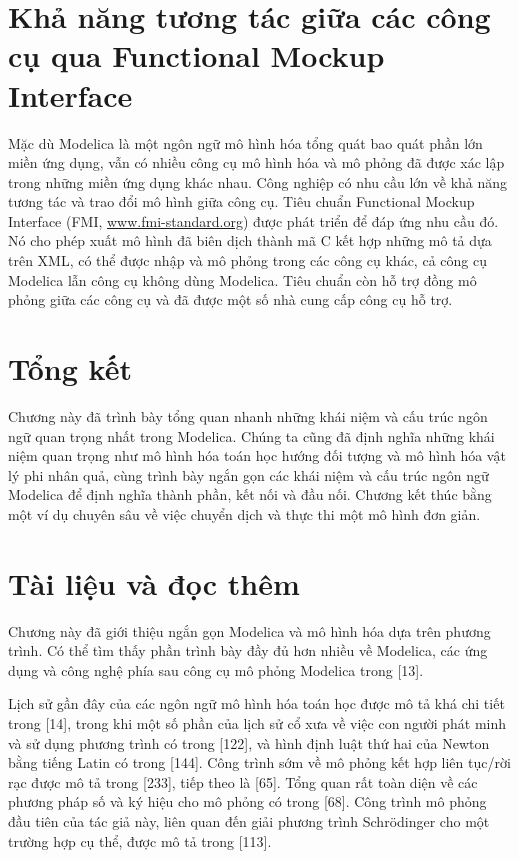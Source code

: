 \section{Khả năng tương tác giữa các công cụ qua Functional Mockup Interface}
Mặc dù Modelica là một ngôn ngữ mô hình hóa tổng quát bao quát phần lớn miền ứng dụng, vẫn có nhiều công cụ mô hình hóa và mô phỏng đã được xác lập trong những miền ứng dụng khác nhau. Công nghiệp có nhu cầu lớn về khả năng tương tác và trao đổi mô hình giữa công cụ. Tiêu chuẩn Functional Mockup Interface (FMI, \url{www.fmi-standard.org}) được phát triển để đáp ứng nhu cầu đó. Nó cho phép xuất mô hình đã biên dịch thành mã C kết hợp những mô tả dựa trên XML, có thể được nhập và mô phỏng trong các công cụ khác, cả công cụ Modelica lẫn công cụ không dùng Modelica. Tiêu chuẩn còn hỗ trợ đồng mô phỏng giữa các công cụ và đã được một số nhà cung cấp công cụ hỗ trợ.

\section{Tổng kết}
Chương này đã trình bày tổng quan nhanh những khái niệm và cấu trúc ngôn ngữ quan trọng nhất trong Modelica. Chúng ta cũng đã định nghĩa những khái niệm quan trọng như mô hình hóa toán học hướng đối tượng và mô hình hóa vật lý phi nhân quả, cùng trình bày ngắn gọn các khái niệm và cấu trúc ngôn ngữ Modelica để định nghĩa thành phần, kết nối và đầu nối. Chương kết thúc bằng một ví dụ chuyên sâu về việc chuyển dịch và thực thi một mô hình đơn giản.

\section{Tài liệu và đọc thêm}
Chương này đã giới thiệu ngắn gọn Modelica và mô hình hóa dựa trên phương trình. Có thể tìm thấy phần trình bày đầy đủ hơn nhiều về Modelica, các ứng dụng và công nghệ phía sau công cụ mô phỏng Modelica trong [13].

Lịch sử gần đây của các ngôn ngữ mô hình hóa toán học được mô tả khá chi tiết trong [14], trong khi một số phần của lịch sử cổ xưa về việc con người phát minh và sử dụng phương trình có trong [122], và hình định luật thứ hai của Newton bằng tiếng Latin có trong [144]. Công trình sớm về mô phỏng kết hợp liên tục/rời rạc được mô tả trong [233], tiếp theo là [65]. Tổng quan rất toàn diện về các phương pháp số và ký hiệu cho mô phỏng có trong [68]. Công trình mô phỏng đầu tiên của tác giả này, liên quan đến giải phương trình Schrödinger cho một trường hợp cụ thể, được mô tả trong [113].

